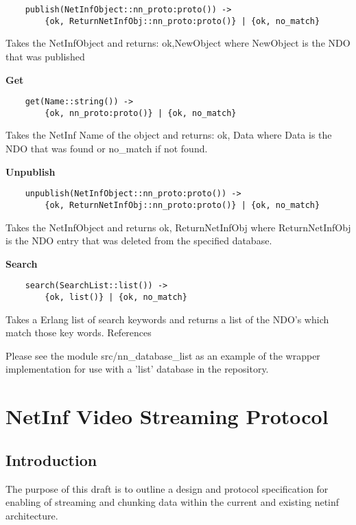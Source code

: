 \documentclass[11pt]{report}
\begin{document}
\begin {verbatim}
    publish(NetInfObject::nn_proto:proto()) -> 
    	{ok, ReturnNetInfObj::nn_proto:proto()} | {ok, no_match}
\end{verbatim}

Takes the NetInfObject and returns: {ok,NewObject} where NewObject is the NDO that was published

\textbf{Get}

\begin {verbatim}
    get(Name::string()) -> 
    	{ok, nn_proto:proto()} | {ok, no_match}
\end{verbatim}

Takes the NetInf Name of the object and returns: {ok, Data} where Data is the NDO that was found or no\_match if not found.

\textbf{Unpublish}

\begin {verbatim}
    unpublish(NetInfObject::nn_proto:proto()) -> 
    	{ok, ReturnNetInfObj::nn_proto:proto()} | {ok, no_match}
\end{verbatim}

Takes the NetInfObject and returns {ok, ReturnNetInfObj} where ReturnNetInfObj is the NDO entry that was deleted from the specified database.

\textbf{Search}

\begin {verbatim}
    search(SearchList::list()) -> 
    	{ok, list()} | {ok, no_match}
\end{verbatim}

Takes a Erlang list of search keywords and returns a list of the NDO's which match those key words.
References

Please see the module src/nn\_database\_list as an example of the wrapper implementation for use with a 'list' database in the repository.



\section {NetInf Video Streaming Protocol}

\subsection{Introduction}

The purpose of this draft is to outline a design and protocol specification for enabling of streaming and chunking data within the current and existing netinf architecture.
\end{document}
